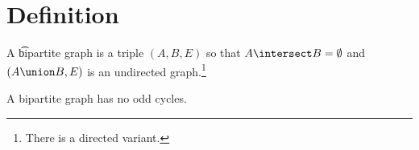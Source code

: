 

\section*{Definition}

A \t{bipartite graph} is a triple $(A, B, E)$ so that $A \intersect B = \emptyset$ and $(A \union B, E)$ is an undirected graph.\footnote{There is a directed variant.}

\begin{proposition}
A bipartite graph has no odd cycles.
\end{proposition}

\blankpage